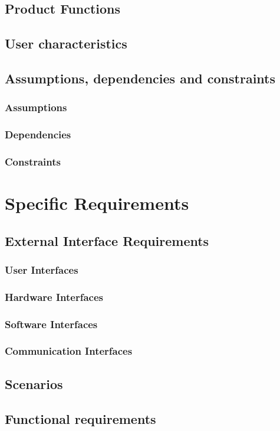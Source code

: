 \documentclass{article}
\begin{document}
\subsection{Product Functions}
\subsection{User characteristics}
\subsection{Assumptions, dependencies and constraints}
\subsubsection{Assumptions}
\subsubsection{Dependencies}
\subsubsection{Constraints}
\section{Specific Requirements}
\subsection{External Interface Requirements}
\subsubsection{User Interfaces}
\subsubsection{Hardware Interfaces}
\subsubsection{Software Interfaces}
\subsubsection{Communication Interfaces}
\subsection{Scenarios}
\subsection{Functional requirements}
\end{document}

